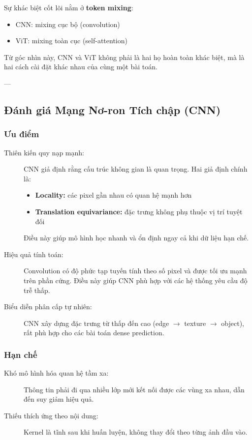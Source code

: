 Sự khác biệt cốt lõi nằm ở \textbf{token mixing}:
\begin{itemize}
	\item CNN: mixing cục bộ (convolution)
	\item ViT: mixing toàn cục (self-attention)
\end{itemize}

Từ góc nhìn này, CNN và ViT không phải là hai họ hoàn toàn khác biệt, mà là hai cách cài đặt khác nhau của cùng một bài toán.

---

\subsection{Đánh giá Mạng Nơ-ron Tích chập (CNN)}
\label{subsec:cnn_evaluation}

\subsubsection{Ưu điểm}

\begin{description}
	\item[Thiên kiến quy nạp mạnh:]  
	CNN giả định rằng cấu trúc không gian là quan trọng. Hai giả định chính là:
	\begin{itemize}
		\item \textbf{Locality:} các pixel gần nhau có quan hệ mạnh hơn
		\item \textbf{Translation equivariance:} đặc trưng không phụ thuộc vị trí tuyệt đối
	\end{itemize}
	Điều này giúp mô hình học nhanh và ổn định ngay cả khi dữ liệu hạn chế.
	
	\item[Hiệu quả tính toán:]  
	Convolution có độ phức tạp tuyến tính theo số pixel và được tối ưu mạnh trên phần cứng.  
	Điều này giúp CNN phù hợp với các hệ thống yêu cầu độ trễ thấp.
	
	\item[Biểu diễn phân cấp tự nhiên:]  
	CNN xây dựng đặc trưng từ thấp đến cao (edge $\rightarrow$ texture $\rightarrow$ object), rất phù hợp cho các bài toán dense prediction.
\end{description}

\subsubsection{Hạn chế}

\begin{description}
	\item[Khó mô hình hóa quan hệ tầm xa:]  
	Thông tin phải đi qua nhiều lớp mới kết nối được các vùng xa nhau, dẫn đến suy giảm hiệu quả.
	
	\item[Thiếu thích ứng theo nội dung:]  
	Kernel là tĩnh sau khi huấn luyện, không thay đổi theo từng ảnh đầu vào.
\end{description}

